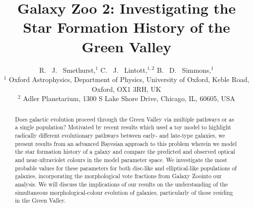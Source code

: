 \documentclass{mn2e}
\begin{document}
\title[Conference abstract]{Galaxy Zoo 2: Investigating the Star Formation History of the Green Valley}
\author[Smethurst et al. 2014]{R. ~J. ~Smethurst,$^1$ C. ~J. ~Lintott,$^{1,2}$ B. ~D. ~Simmons,$^{1}$ \\ $^1$ Oxford Astrophysics, Department of Physics, University of Oxford, Keble Road, Oxford, OX1 3RH, UK \\ $^2$ Adler Planetarium, 1300 S Lake Shore Drive, Chicago, IL, 60605, USA }

\maketitle

\begin{abstract}
Does galactic evolution proceed through the Green Valley via multiple pathways or as a single population? Motivated by recent results which used a toy model to highlight radically different evolutionary pathways between early- and late-type galaxies, we present results from an advanced Bayesian approach to this problem wherein we model the star formation history of a galaxy and compare the predicted and observed optical and near-ultraviolet colours in the model parameter space. We investigate the most probable values for these parameters for both disc-like and elliptical-like populations of galaxies, incorporating the morphological vote fractions from Galaxy Zoo\footnotemark[1] into our analysis. We will discuss the implications of our results on the understanding of the simultaneous morphological-colour evolution of galaxies, particularly of those residing in the Green Valley. 
\end{abstract}

\end{document}

